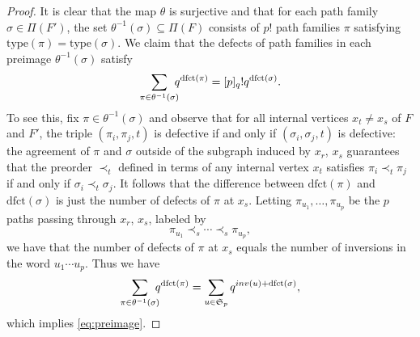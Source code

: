 \documentclass[10pt,a4paper]{amsart}
\newcommand{\ctr}[1]{{x}_{#1}}
\newcommand{\dfct}{\mathrm{dfct}}
\newcommand{\inv}{\textsc{inv}}
\newcommand{\mfs}[1]{\mathfrak{S}_{#1}}
\newcommand{\nTksp}{\negthickspace\negthickspace}
\newcommand{\type}{\mathrm{type}}
\begin{document}
\begin{proof}
             It is clear that 
             the map $\theta$ is surjective and that 
             for each path family $\sigma \in \Pi(F')$, 
        the set $\theta^{-1}(\sigma) \subseteq \Pi(F)$ consists of $p!$ path families $\pi$ satisfying $\type(\pi) =  \type(\sigma)$.
        We claim that the defects of
            path families in each preimage $\theta^{-1}(\sigma)$ satisfy
    \begin{equation}\label{eq:preimage}
        \sum_{\pi \in \theta^{-1}(\sigma)} 
        \nTksp q^{\dfct(\pi)} = [p]_q! q^{\dfct(\sigma)} .
    \end{equation}
    To see this, fix $\pi \in \theta^{-1}(\sigma)$ and observe that for all internal vertices $\ctr t \neq \ctr s$ of $F$ and $F'$, the triple $(\pi_i, \pi_j,  t)$ is defective if and only if $(\sigma_i, \sigma_j, t)$ is defective:
    the agreement of $\pi$ and $\sigma$ outside of the subgraph induced by $\ctr r$, $\ctr s$ guarantees that
    the preorder $\prec_t$ defined in terms of any internal vertex $\ctr t$ satisfies
    $\pi_i \prec_t \pi_j$ if and only if $\sigma_i \prec_t \sigma_j$. It follows that the difference between $\dfct(\pi)$ and
    $\dfct(\sigma)$ is just the number of defects of $\pi$ at $\ctr s$.
    Letting $\pi_{u_1}, \dotsc, \pi_{u_p}$ be the $p$ paths passing through $\ctr r$, $\ctr s$, labeled by
    \begin{equation*}
        \pi_{u_1} \prec_s \cdots \prec_s \pi_{u_p},
    \end{equation*}
we have that the number of defects of $\pi$ at $\ctr s$ 
equals the number of inversions in the word $u_1 \cdots u_p$.
Thus we have
\begin{equation*}
\sum_{\pi \in \theta^{-1}(\sigma)} \nTksp q^{\dfct(\pi)} = 
\sum_{u \in \mfs p} q^{\inv(u) + \dfct(\sigma)},
\end{equation*}
which implies \eqref{eq:preimage}.


\end{proof}
\end{document}
